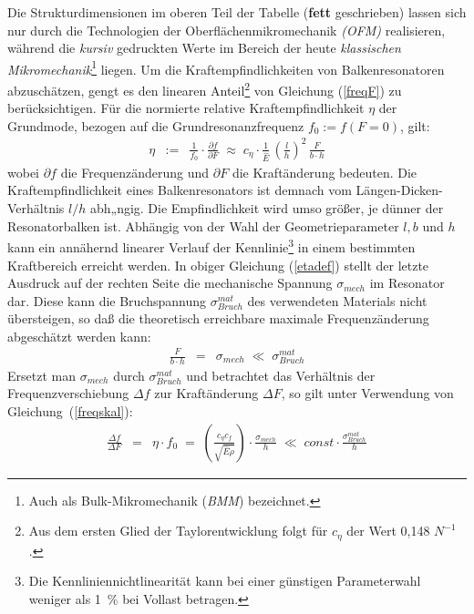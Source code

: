 Die Strukturdimensionen im oberen Teil der Tabelle ({\bf fett}
geschrieben) lassen
sich nur durch die Technologien der Oberflächenmikromechanik
{\em (OFM)} realisieren, während die {\em kursiv}
gedruckten Werte im Bereich der heute {\em klassischen
Mikromechanik}\footnote{Auch als Bulk-Mikromechanik ({\em BMM}) bezeichnet.}
liegen. Um die Kraftempfindlichkeiten
von Balkenresonatoren abzuschätzen, gengt es den linearen
Anteil\footnote{Aus dem ersten Glied der Taylorentwicklung folgt für
$c_{\eta}$ der Wert 0,148 $N^{-1}$.} von Gleichung (\ref{freqF})
zu berücksichtigen. Für die normierte relative Kraftempfindlichkeit
$\eta$ der Grundmode, bezogen auf die Grundresonanzfrequenz
$f_{0} := f(F=0)$, gilt:
%
\begin{eqnarray}
\label{etadef}
     \eta & := & \frac{1}{f_{0}} \cdot \frac{\partial f}{\partial F}
          \; \approx \; c_{\eta} \cdot \frac{1}{\hat E} \,
            \left( \frac{l}{h} \right)^{2} \, \frac{F}{b \cdot h}
\end{eqnarray}
%
wobei $\partial f$ die Frequenzänderung und $\partial F$ die Kraftänderung
bedeuten.
Die Kraftempfindlichkeit eines Balkenresonators ist demnach vom
Längen-Dicken-Verhältnis $ l/h $ abh„ngig.  Die Empfindlichkeit wird
umso größer, je dünner der Resonatorbalken ist.  Abhängig von der Wahl
der Geometrieparameter $l, b$ und $h$ kann ein annähernd linearer
Verlauf der Kennlinie\footnote{Die Kennliniennichtlinearität kann bei
einer günstigen Parameterwahl weniger als 1~\% bei Vollast betragen.} in
einem bestimmten Kraftbereich erreicht werden.  In obiger Gleichung
(\ref{etadef})
stellt der letzte Ausdruck auf der rechten Seite die mechanische
Spannung $\sigma_{mech}$ im Resonator dar.  Diese kann die
Bruchspannung $\sigma_{Bruch}^{mat}$ des verwendeten Materials nicht
übersteigen, so daß die theoretisch erreichbare maximale
Frequenzänderung abgeschätzt werden kann:
%
\begin{eqnarray}
     \frac{F}{b \cdot h} & = & \sigma_{mech}
     \; \ll \; \sigma_{Bruch}^{mat}
\end{eqnarray}
%
Ersetzt man $\sigma_{mech}$ durch $\sigma_{Bruch}^{mat}$ und betrachtet
das Verhältnis der Frequenzverschiebung $\Delta f$ zur Kraftänderung
$\Delta F$, so gilt unter Verwendung von Gleichung~(\ref{freqskal}):
%
\begin{eqnarray}
\label{etaf}
    \frac{\Delta f}{\Delta F} & = & \eta \cdot f_{0} \; = \;
     \left( \frac{c_{\eta}c_{f}}{\sqrt{\hat E \rho}} \right) \cdot
     \frac{\sigma_{mech}}{h} \; \ll \; const \cdot
     \frac{\sigma_{Bruch}^{mat}}{h}
\end{eqnarray}
